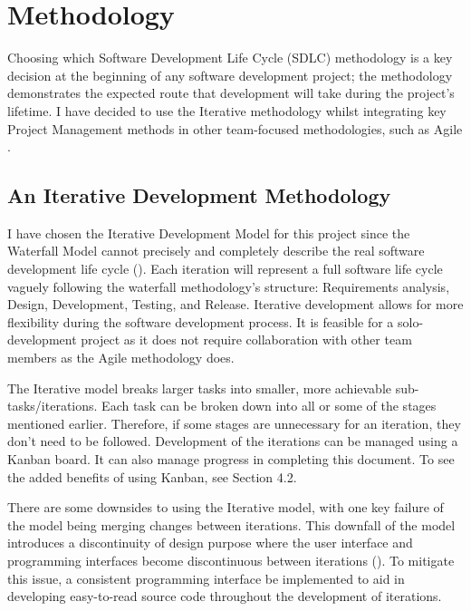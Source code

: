 \chapter{Methodology}
\label{chap:methodology}

Choosing which Software Development Life Cycle (SDLC) methodology is a key decision at the beginning of any software development project; the methodology demonstrates the expected route that development will take during the project's lifetime. I have decided to use the Iterative methodology whilst integrating key Project Management methods in other team-focused methodologies, such as Agile .

\section{An Iterative Development Methodology}
\label{methodology:chosen}

I have chosen the Iterative Development Model for this project since the Waterfall Model cannot precisely and completely describe the real software development life cycle (\cite{dapeng_liu_case_2011}).
Each iteration will represent a full software life cycle vaguely following the waterfall methodology's structure: Requirements analysis, Design, Development, Testing, and Release. Iterative development allows for more flexibility during the software development process. It is feasible for a solo-development project as it does not require collaboration with other team members as the Agile methodology does.

The Iterative model breaks larger tasks into smaller, more achievable sub-tasks/iterations. Each task can be broken down into all or some of the stages mentioned earlier. Therefore, if some stages are unnecessary for an iteration, they don't need to be followed. Development of the iterations can be managed using a Kanban board. It can also manage progress in completing this document. To see the added benefits of using Kanban, see Section 4.2.

There are some downsides to using the Iterative model, with one key failure of the model being merging changes between iterations. This downfall of the model introduces a discontinuity of design purpose where the user interface and programming interfaces become discontinuous between iterations (\cite{dapeng_liu_case_2011}). To mitigate this issue, a consistent programming interface be implemented to aid in developing easy-to-read source code throughout the development of iterations.